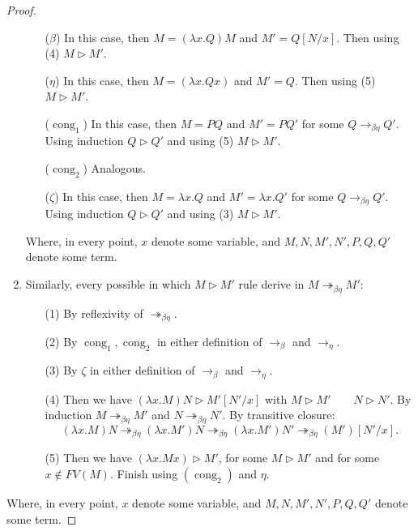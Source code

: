 \begin{proof}
\begin{enumerate}
    \begin{itemize}
    \item[($\beta$)] In this case, then $M=(\lambda x.Q)M$ and $M' = Q[N/x]$. Then using (4) $M \triangleright M'$.
    \item[($\eta$)] In this case, then $M=(\lambda x.Qx)$ and $M' = Q$. Then using (5) $M \triangleright M'$.
    \item[($\operatorname{cong}_1$)] In this case, then $M=PQ$ and $M' = PQ'$ for some $Q\to_{\beta\eta} Q'$. Using induction $Q\triangleright Q'$ and using (5) $M \triangleright M'$. 
    \item[($\operatorname{cong}_2$)]  Analogous.
    \item[($\zeta$)] In this case, then $M=\lambda x.Q$ and $M' = \lambda x.Q'$ for some $Q\to_{\beta\eta} Q'$. Using induction $Q\triangleright Q'$ and using (3) $M \triangleright M'$.  
    \end{itemize}
    Where, in every point, $x$ denote some variable, and $M,N,M',N',P,Q,Q'$ denote some term.
  \item Similarly, every possible in which $M\triangleright M'$ rule derive in  $M \twoheadrightarrow_{\beta\eta} M'$:
    \begin{itemize}
    \item[(1)] By reflexivity of $ \twoheadrightarrow_{\beta\eta}$.
    \item[(2)] By $\operatorname{cong}_1,\operatorname{cong}_2$ in either definition of $\to_\beta$ and $\to_\eta$.
    \item[(3)] By $\zeta$ in either definition of $\to_\beta$ and $\to_\eta$.
    \item[(4)] Then we have $(\lambda x.M)N \triangleright M'[N'/x]$ with $M \triangleright M'\qquad N \triangleright N'$. By induction $M \twoheadrightarrow_{\beta\eta} M'$ and $N \twoheadrightarrow_{\beta\eta} N'$. By transitive closure:
      $$(\lambda x.M)N \twoheadrightarrow_{\beta\eta}(\lambda x.M')N \twoheadrightarrow_{\beta\eta} (\lambda x.M')N' \twoheadrightarrow_{\beta\eta} (M')[N'/x].$$
    \item[(5)] Then we have $(\lambda x.Mx) \triangleright M'$, for some $M\triangleright M'$ and for some $x \not  \in FV(M)$. Finish using $(\operatorname{cong}_2)$ and $\eta$.
    \end{itemize}

  \end{enumerate}
      Where, in every point, $x$ denote some variable, and $M,N,M',N',P,Q,Q'$ denote some term.
\end{proof}

